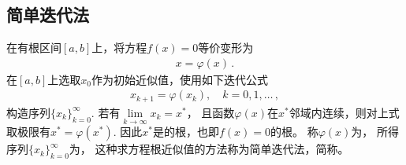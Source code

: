 \subsection{简单迭代法}\label{sub:简单迭代法}
\begin{definition}
    在有根区间$[a,b]$上，将方程$f(x)=0$等价变形为
    \begin{align}\label{eq:02ex0306}
        x=\varphi(x)\, .
    \end{align}
    在$[a,b]$上选取$x_0$作为初始近似值，使用如下迭代公式
    \begin{align}\label{eq:02ex0307}
        x_{k+1}=\varphi(x_k),\quad k=0,1,\ldots\, ,
    \end{align}
    构造序列$\{x_k\}_{k=0}^\infty$.
    若有$\displaystyle\lim\limits_{k\rightarrow\infty}{x_k}=x^*$，
    且函数$\varphi(x)$在$x^*$邻域内连续，则对上式取极限有$x^*=\varphi(x^*)$.
    因此$x^*$是的根，也即$f(x)=0$的根。
    称$\varphi(x)$为，
    所得序列$\{x_k\}_{k=0}^\infty$为，
    这种求方程根近似值的方法称为简单迭代法，简称。
\end{definition}

